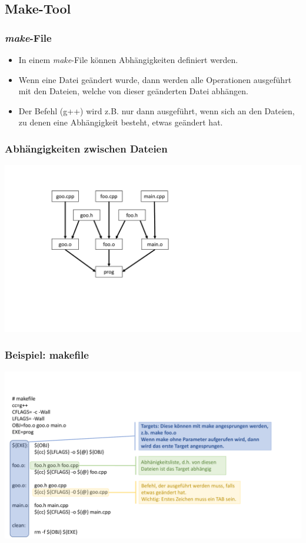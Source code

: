 \subsection{Make-Tool}

\begin{multicols}{2}
\subsubsection{\emph{make}-File}
\begin{itemize}
	\item In einem \emph{make}-File können Abhängigkeiten definiert werden.
	\item Wenn eine Datei geändert wurde, dann werden alle Operationen ausgeführt mit den Dateien, welche von dieser geänderten Datei abhängen.
	\item Der Befehl (g++) wird z.B. nur dann ausgeführt, wenn sich an den Dateien, zu denen eine Abhängigkeit besteht, etwas geändert hat.
\end{itemize}
\vfill\null
\columnbreak
\subsubsection{Abhängigkeiten zwischen Dateien}
\includegraphics[width=0.7\linewidth]{images/make1.pdf}
\end{multicols}

\subsubsection{Beispiel: makefile}
\noindent
\begin{minipage}{\linewidth}
	\includegraphics[width=\linewidth]{images/makefile.pdf}
\end{minipage}